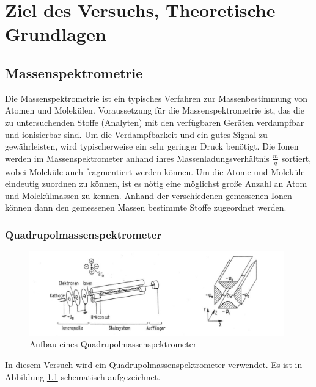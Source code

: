 \chapter{Ziel des Versuchs, Theoretische Grundlagen}
\section{Massenspektrometrie}
Die Massenspektrometrie ist ein typisches Verfahren zur Massenbestimmung von Atomen und Molekülen. Voraussetzung für die Massenspektrometrie ist, das die zu untersuchenden Stoffe (Analyten) mit den verfügbaren Geräten verdampfbar und ionisierbar sind. Um die Verdampfbarkeit und ein gutes Signal zu gewährleisten, wird typischerweise ein sehr geringer Druck benötigt. Die Ionen werden im Massenspektrometer anhand ihres Massenladungsverhältnis $\frac{m}{q}$ sortiert, wobei Moleküle auch fragmentiert werden können. Um die Atome und Moleküle eindeutig zuordnen zu können, ist es nötig eine möglichst große Anzahl an Atom und Molekülmassen zu kennen. Anhand der verschiedenen gemessenen Ionen können dann den gemessenen Massen bestimmte Stoffe zugeordnet werden. 
\subsection{Quadrupolmassenspektrometer}
\begin{figure}
    \centering
    \includegraphics[width=110mm,scale=0.5]{Massenspektrometer/include/quadrupolms.png}
    \caption{Aufbau eines Quadrupolmassenspektrometer \cite{VorbereitungsMappe}}
    \label{fig:quadrupolms}
\end{figure}
In diesem Versuch wird ein Quadrupolmassenspektrometer verwendet. Es ist in Abbildung \ref{fig:quadrupolms} schematisch aufgezeichnet. 

